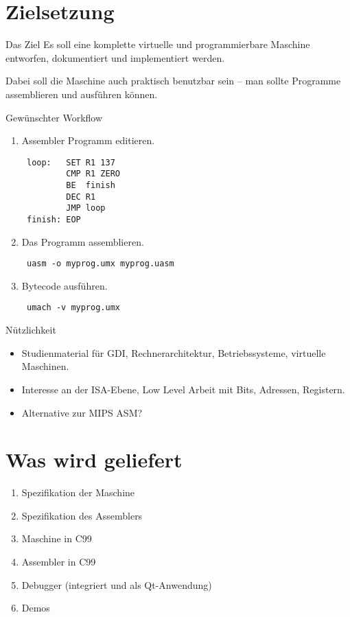 
\section{Zielsetzung}

\begin{frame}{Das Ziel}
 Es soll eine komplette virtuelle und programmierbare Maschine entworfen,
 dokumentiert und implementiert werden.

 Dabei soll die Maschine auch praktisch benutzbar sein -- man sollte Programme
 assemblieren und ausführen können.
\end{frame}

\begin{frame}[fragile]{Gewünschter Workflow}
 \begin{enumerate}
  \item Assembler Programm editieren.
\begin{lstlisting}
 loop:   SET R1 137
         CMP R1 ZERO
         BE  finish
         DEC R1
         JMP loop
 finish: EOP
\end{lstlisting}
  \item Das Programm assemblieren.
\begin{lstlisting}
 uasm -o myprog.umx myprog.uasm
\end{lstlisting}
  \item \glqq{}Bytecode\grqq{} ausführen.
\begin{lstlisting}
 umach -v myprog.umx
\end{lstlisting}
 \end{enumerate}

\end{frame}


\begin{frame}{Nützlichkeit}
 \begin{itemize}
  \item Studienmaterial für GDI, Rechnerarchitektur, Betriebssysteme, virtuelle
        Maschinen.
  \item Interesse an der ISA-Ebene, Low Level Arbeit mit Bits, Adressen,
        Registern.
  \item Alternative zur MIPS ASM?
 \end{itemize}
\end{frame}


\section{Was wird geliefert}

\begin{frame}{\insertsection}
 \begin{enumerate}
  \item Spezifikation der Maschine
  \item Spezifikation des Assemblers
  \item Maschine in C99
  \item Assembler in C99
  \item Debugger (integriert und als Qt-Anwendung)
  \item Demos
 \end{enumerate}
\end{frame}



